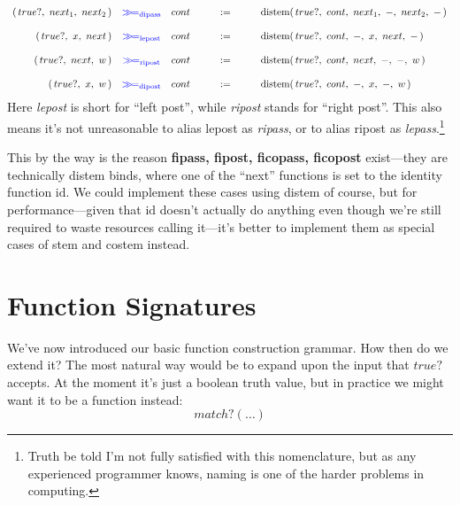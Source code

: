 \documentclass[twoside]{article}
\newcommand{\strong}[1]{{\bfseries #1}}
\newcommand{\qqdefeq}{\ensuremath{\qquad :=\qquad}}
\newcommand{\distem}{\mbox{distem}}
\newcommand{\bind}[2]{\ensuremath{\textcolor{#1}{>\hspace{-1ex}>\!=_{\mbox{\scriptsize #2}}}}}
\newcommand{\dipass}[1][blue]{\bind{#1}{dipass}}
\newcommand{\dipost}[1][blue]{\bind{#1}{dipost}}
\newcommand{\lepost}[1][blue]{\bind{#1}{lepost}}
\newcommand{\ripost}[1][blue]{\bind{#1}{ripost}}
\newcommand{\id}{\mbox{id}}
\begin{document}
\noindent\strong{distem's bind operators:}

$$ \begin{array}{rclcl}
(\,true?,\ next_1,\ next_2\,)		& \dipass & cont & \qqdefeq & \distem(\,true?,\ cont,\ next_1,\ -,\ next_2,\ -\,)	\\
																\\
(\,true?,\ x,\ next\,)			& \lepost & cont & \qqdefeq & \distem(\,true?,\ cont,\ -,\ x,\ next,\ -\,)		\\
																\\
(\,true?,\ next,\ w\,)			& \ripost & cont & \qqdefeq & \distem(\,true?,\ cont,\ next,\ -,\ -,\ w\,)		\\
																\\
(\,true?,\ x,\ w\,)			& \dipost & cont & \qqdefeq & \distem(\,true?,\ cont,\ -,\ x,\ -,\ w\,)
\end{array} $$
Here \emph{lepost} is short for ``left post'', while \emph{ripost} stands for ``right post''. This also means it's not
unreasonable to alias lepost as \emph{ripass}, or to alias ripost as \emph{lepass}.\footnote{Truth be told I'm not fully
satisfied with this nomenclature, but as any experienced programmer knows, naming is one of the harder problems in computing.}

This by the way is the reason \strong{fipass, fipost, ficopass, ficopost} exist---they are technically distem binds, where one
of the ``next'' functions is set to the identity function $ \id $.  We could implement these cases using distem of course,
but for performance---given that $ \id $ doesn't actually do anything even though we're still required to waste resources
calling it---it's better to implement them as special cases of stem and costem instead.

\section*{Function Signatures}

We've now introduced our basic function construction grammar. How then do we extend it? The most natural way would be to
expand upon the input that $ true? $ accepts. At the moment it's just a boolean truth value, but in practice we might want
it to be a function instead:
$$ match?(\ldots) $$
\end{document}
